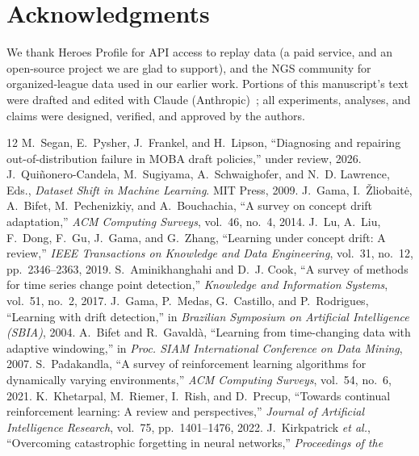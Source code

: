 \documentclass[journal]{IEEEtran}
\newif\ifanonymous
\begin{document}
\section*{Acknowledgments}
We thank Heroes Profile for API access to replay data (a paid service,
and an open-source project we are glad to support), and the NGS
community for organized-league data used in our earlier work. Portions
of this manuscript's text were drafted and edited with Claude
(Anthropic)~\cite{claude}; all experiments, analyses, and claims were
designed, verified, and approved by the authors.
\fi

\begin{thebibliography}{12}
 \ifanonymous Anonymous authors\else M.~Segan,
E.~Pysher, J.~Frankel, and H.~Lipson\fi, ``Diagnosing and repairing
out-of-distribution failure in MOBA draft policies,'' under review,
2026.
 J.~Qui\~nonero-Candela, M.~Sugiyama,
A.~Schwaighofer, and N.~D. Lawrence, Eds., \emph{Dataset Shift in
Machine Learning}. MIT Press, 2009.
 J.~Gama, I.~\v{Z}liobait\.{e}, A.~Bifet,
M.~Pechenizkiy, and A.~Bouchachia, ``A survey on concept drift
adaptation,'' \emph{ACM Computing Surveys}, vol.~46, no.~4, 2014.
 J.~Lu, A.~Liu, F.~Dong, F.~Gu, J.~Gama, and
G.~Zhang, ``Learning under concept drift: A review,'' \emph{IEEE
Transactions on Knowledge and Data Engineering}, vol.~31, no.~12,
pp.~2346--2363, 2019.
 S.~Aminikhanghahi and D.~J. Cook,
``A survey of methods for time series change point detection,''
\emph{Knowledge and Information Systems}, vol.~51, no.~2, 2017.
 J.~Gama, P.~Medas, G.~Castillo, and P.~Rodrigues,
``Learning with drift detection,'' in \emph{Brazilian Symposium on
Artificial Intelligence (SBIA)}, 2004.
 A.~Bifet and R.~Gavald\`a, ``Learning from
time-changing data with adaptive windowing,'' in \emph{Proc. SIAM
International Conference on Data Mining}, 2007.
 S.~Padakandla, ``A survey of
reinforcement learning algorithms for dynamically varying
environments,'' \emph{ACM Computing Surveys}, vol.~54, no.~6, 2021.
 K.~Khetarpal, M.~Riemer, I.~Rish, and
D.~Precup, ``Towards continual reinforcement learning: A review and
perspectives,'' \emph{Journal of Artificial Intelligence Research},
vol.~75, pp.~1401--1476, 2022.
 J.~Kirkpatrick \emph{et al.}, ``Overcoming
catastrophic forgetting in neural networks,'' \emph{Proceedings of the
}
\end{thebibliography}
\end{document}
